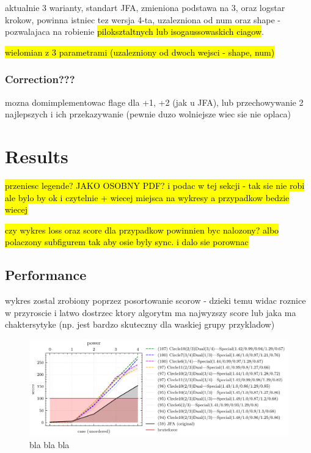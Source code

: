\documentclass{article}
\begin{document}
aktualnie 3 warianty, standart JFA, zmieniona podstawa na 3, oraz logstar krokow,
powinna istniec tez wersja 4-ta, uzalezniona od num oraz shape - pozwalajaca na
robienie \hl{piloksztaltnych lub isogaussowaskich ciagow}.

\hl{wielomian z 3 parametrami (uzalezniony od dwoch
wejsci - shape, num)}

\subsubsection{Correction???} %

mozna domimplementowac flage dla +1, +2 (jak u JFA), lub przechowywanie 2
najlepszych i ich przekazywanie (pewnie duzo wolniejsze wiec sie nie oplaca)

\section{Results} %

\hl {przeniesc legende? JAKO OSOBNY PDF? i podac w tej sekcji - tak sie nie robi
ale bylo by ok i czytelnie + wiecej miejsca na wykresy a przypadkow bedzie
wiecej}

\hl{czy wykres loss oraz score dla przypadkow powinnien byc nalozony? albo
polaczony subfigurem tak aby osie byly sync. i dalo sie porownac}

\subsection{Performance} %

wykres zostal zrobiony poprzez posortowanie scorow - dzieki temu widac roznice w
przyroscie i latwo dostrzec ktory algorytm ma najwyzszy score lub jaka ma
chaktersytyke (np. jest bardzo skuteczny dla waskiej grupy przykladow)

\begin{figure}[H]
	\centering
	\includegraphics[width=\linewidth]{../figures/figure-4-power}
	\caption{bla bla bla}
	\label{fig:abstract}
\end{figure}
\end{document}
